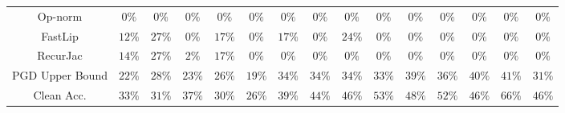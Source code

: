\begin{table*}
{\begin{tabular}{c|c|c|c|c|c|c|c|c|c|c|c|c|c|c}
      Op-norm &         $0\%$ &         $0\%$ &         $0\%$ &         $0\%$ &         $0\%$ &         $0\%$ &         $0\%$ &         $0\%$ &         $0\%$ &         $0\%$ &         $0\%$ &         $0\%$ &         $0\%$ &         $0\%$ \\
      FastLip &        $12\%$ &        $27\%$ &         $0\%$ &        $17\%$ &         $0\%$ &        $17\%$ &         $0\%$ &        $24\%$ &         $0\%$ &         $0\%$ &         $0\%$ &         $0\%$ &         $0\%$ &         $0\%$ \\
     RecurJac &        $14\%$ &        $27\%$ &         $2\%$ &        $17\%$ &         $0\%$ &         $0\%$ &         $0\%$ &         $0\%$ &         $0\%$ &         $0\%$ &         $0\%$ &         $0\%$ &         $0\%$ &         $0\%$ \\
\hline
PGD Upper Bound &        $22\%$ &        $28\%$ &        $23\%$ &        $26\%$ &        $19\%$ &        $34\%$ &        $34\%$ &        $34\%$ &        $33\%$ &        $39\%$ &        $36\%$ &        $40\%$ &        $41\%$ &        $31\%$ \\
\hline
   Clean Acc. &        $33\%$ &        $31\%$ &        $37\%$ &        $30\%$ &        $26\%$ &        $39\%$ &        $44\%$ &        $46\%$ &        $53\%$ &        $48\%$ &        $52\%$ &        $46\%$ &        $66\%$ &        $46\%$ \\
\bottomrule

    \end{tabular}
    }
    \label{tab:exp-A-cifar10-verify-robust-acc}
\end{table*}

